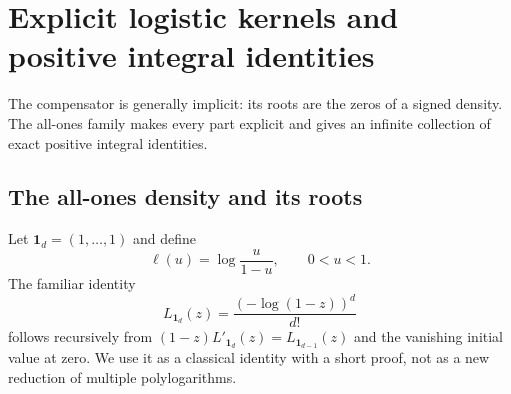 \section{Explicit logistic kernels and positive integral identities}
\label{ado:sec:identities}
The compensator is generally implicit: its roots are the zeros of a
signed density. The all-ones family makes every part explicit and gives
an infinite collection of exact positive integral identities.

\subsection{The all-ones density and its roots}
Let $\boldsymbol{1}_d=(1,\ldots,1)$ and define
\[
 \ell(u)=\log\frac{u}{1-u},\qquad 0<u<1.
\]
The familiar identity
\begin{equation}\label{ado:eq:allonesLi}
 L_{\boldsymbol{1}_d}(z)=\frac{(-\log(1-z))^d}{d!}
\end{equation}
follows recursively from
$(1-z)L'_{\boldsymbol{1}_d}(z)=L_{\boldsymbol{1}_{d-1}}(z)$ and the vanishing initial
value at zero. We use it as a classical identity with a short proof,
not as a new reduction of multiple polylogarithms.

